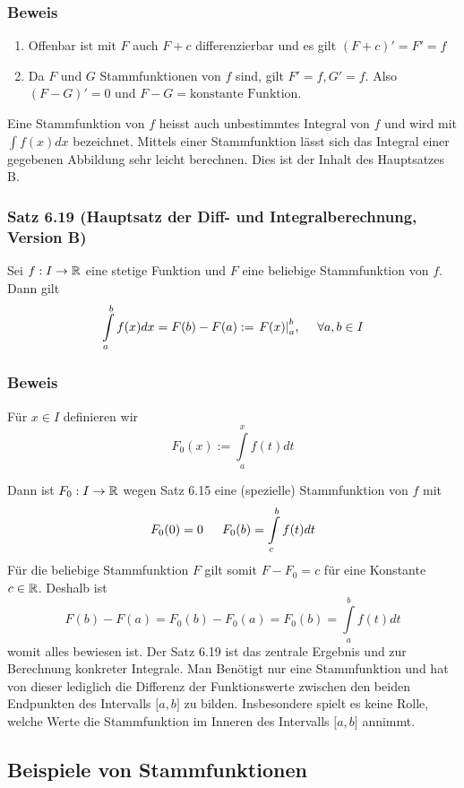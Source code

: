 \subsubsection*{Beweis}
\begin{enumerate}[\indent (a)]
\item Offenbar ist mit $F$ auch $F+c$ differenzierbar und es gilt $(F+c)'=F'=f$
\item Da $F$ und $G$ Stammfunktionen von $f$ sind, gilt $F'=f, G'=f$. Also $(F-G)'=0$ und $F-G=\text{konstante Funktion}$.
\end{enumerate}

\begin{definition}{6.18}
 Eine Stammfunktion von $f$ heisst auch unbestimmtes Integral von $f$ und wird mit $\int {f(x)dx}$ bezeichnet. Mittels einer Stammfunktion lässt sich das Integral einer gegebenen Abbildung sehr leicht berechnen. Dies ist der Inhalt des Hauptsatzes B.\\
\end{definition}
\subsubsection*{Satz 6.19 (Hauptsatz der Diff- und Integralberechnung, Version B)}
Sei $f:I\to\mathbb{R}$ eine stetige Funktion und $F$ eine beliebige Stammfunktion von $f$. Dann gilt \[\int\limits_a^b {f(x)dx = F(b) - F(a): = \left. {F(x)} \right|_a^b}\text{,\indent}\forall a,b\in I \]

\subsubsection*{Beweis}
Für $x\in I$ definieren wir \[F_0(x):=\int\limits_a^x {f(t)dt} \]

Dann ist $F_0:I\to\mathbb{R}$ wegen Satz 6.15 eine (spezielle) Stammfunktion von $f$ mit \[{F_0}(0) = 0\text{\indent}{F_0}(b) = \int\limits_c^b {f(t)dt} \]
Für die beliebige Stammfunktion $F$ gilt somit $F-F_0=c$ für eine Konstante $c\in\mathbb{R}$. Deshalb ist \[F(b) - F(a) = {F_0}(b) - {F_0}(a) = {F_0}(b) = \int\limits_a^b {f(t)dt} \] womit alles bewiesen ist. Der Satz 6.19 ist das zentrale Ergebnis und zur Berechnung konkreter Integrale. Man Benötigt nur eine Stammfunktion und hat von dieser lediglich die Differenz der Funktionswerte zwischen den beiden Endpunkten des Intervalls $\lbrack a,b\rbrack$ zu bilden.
Insbesondere spielt es keine Rolle, welche Werte die Stammfunktion im Inneren des Intervalls  $\lbrack a,b\rbrack$ annimmt.
\subsection*{Beispiele von Stammfunktionen}
